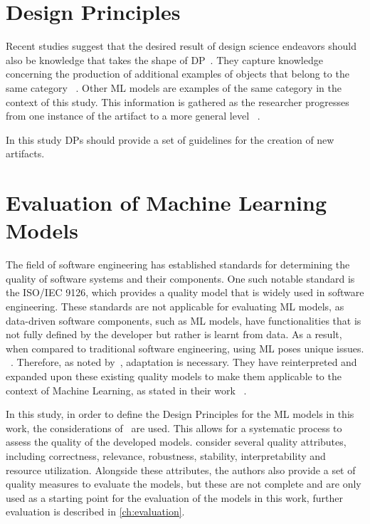\section{Design Principles}\label{sec:design-principles}
Recent studies suggest that the desired result of design science endeavors should also be knowledge that takes the
shape of
\ac{DP}~\cite{baskerville2010explanatory, sein2011action, gregor2013positioning}.
They capture knowledge concerning the production of additional examples of objects that belong to the same
category
~\cite[p. 39]{sein2011action}.
Other ML models are examples of the same category in the context of this study.
This information is gathered as the researcher progresses from one instance of the artifact to a more general level
~\cite[p. 37]{chandra2016making}.

In this study \ac{DP}s should provide a set of guidelines for the creation of new artifacts.


\section{Evaluation of Machine Learning Models}\label{sec:evaluation-of-machine-learning-models}
The field of software engineering has established standards for determining the quality of software systems and their
components.
One such notable standard is the ISO/IEC 9126, which provides a quality model that is widely used in
software engineering.
These standards are not applicable for evaluating \ac{ML} models, as data-driven software components, such
as \ac{ML} models, have functionalities that is not fully defined by the developer but rather is learnt from data.
As a result, when compared to traditional software engineering, using ML poses unique issues.
~\cite[p. 2]{siebert2022construction}.
Therefore, as noted by~\cite{siebert2022construction}, adaptation is necessary.
They have reinterpreted and expanded upon these existing quality models to make them applicable to the context of
Machine Learning, as stated in their work
~\cite[p. 1]{siebert2022construction}.

In this study, in order to define the Design Principles for the \ac{ML} models in this work, the
considerations of~\cite[]{siebert2022construction} are used.
This allows for a systematic process to assess the quality of the developed models.
\cite{siebert2022construction} consider several quality attributes, including
correctness, relevance, robustness, stability, interpretability and resource utilization.
Alongside these attributes, the authors also provide a set of quality measures to evaluate the
models, but these are not complete and are only used as a starting point for the evaluation of the
models in this work, further evaluation is described in \cref{ch:evaluation}.


